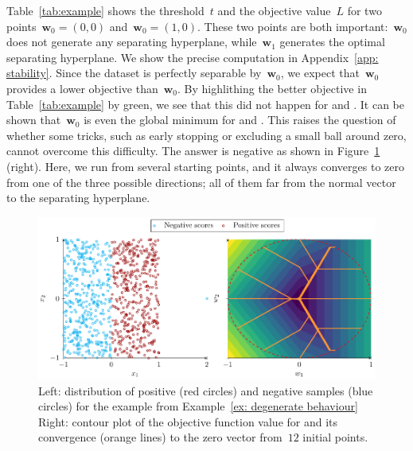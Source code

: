 \noindent Table~\ref{tab:example} shows the threshold~$t$ and the objective value~$L$ for two points~$\bm{w}_0=(0,0)$ and~$\bm{w}_0=(1,0)$. These two points are both important:~$\bm{w}_0$ does not generate any separating hyperplane, while~$\bm{w}_1$ generates the optimal separating hyperplane. We show the precise computation in Appendix~\ref{app: stability}. Since the dataset is perfectly separable by~$\bm{w}_0$, we expect that~$\bm{w}_0$ provides a lower objective than~$\bm{w}_0$. By highlithing the better objective in Table~\ref{tab:example} by green, we see that this did not happen for \TopPush and \TopMeanK. It can be shown that~$\bm{w}_0$ is even the global minimum for \TopPush and \TopMeanK. This raises the question of whether some tricks, such as early stopping or excluding a small ball around zero, cannot overcome this difficulty. The answer is negative as shown in Figure~\ref{fig: degenerate behaviour} (right). Here, we run \TopPush from several starting points, and it always converges to zero from one of the three possible directions; all of them far from the normal vector to the separating hyperplane.

\begin{figure}
  \centering
  \includegraphics[width=\linewidth]{images/toppush_convergence.pdf}
  \caption{Left: distribution of positive (red circles) and negative samples (blue circles) for the example from Example~\ref{ex: degenerate behaviour} Right: contour plot of the objective function value for \TopPush and its convergence (orange lines) to the zero vector from~$12$ initial points.}
  \label{fig: degenerate behaviour}
\end{figure}


